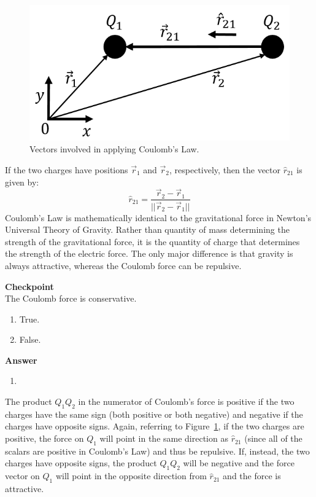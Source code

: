 \begin{figure}[!htbp]
\centering
\includegraphics[width=0.5\linewidth]{files/coulombforce-596abbc328557b381fefd6d5708cb366.png}
\caption[]{Vectors involved in applying Coulomb's Law.}
\label{fig:chargesfields:coulombforce}
\end{figure}

If the two charges have positions $\vec r_1$ and $\vec r_2$, respectively, then the vector $\hat r_{21}$ is given by:
\begin{equation}
\hat r_{21} = \frac{\vec r_2 - \vec r_1}{||\vec r_2 - \vec r_1||}
\end{equation}
Coulomb's Law is mathematically identical to the gravitational force in Newton's Universal Theory of Gravity. Rather than quantity of mass determining the strength of the gravitational force, it is the quantity of charge that determines the strength of the electric force. The only major difference is that gravity is always attractive, whereas the Coulomb force can be repulsive.

\begin{framed}
\textbf{Checkpoint}\\
The Coulomb force is conservative.

\begin{enumerate}
\item True.
\item False.
\end{enumerate}

\begin{framed}
\textbf{Answer}\\
\begin{enumerate}
\item
\end{enumerate}
\end{framed}
\end{framed}

The product $Q_1Q_2$ in the numerator of Coulomb's force is positive if the two charges have the same sign (both positive or both negative) and negative if the charges have opposite signs. Again, referring to Figure~\ref{fig:chargesfields:coulombforce}, if the two charges are positive, the force on $Q_1$ will point in the same direction as $\hat r_{21}$ (since all of the scalars are positive in Coulomb's Law) and thus be repulsive. If, instead, the two charges have opposite signs, the product $Q_1Q_2$ will be negative and the force vector on $Q_1$ will point in the opposite direction from $\hat r_{21}$ and the force is attractive.

